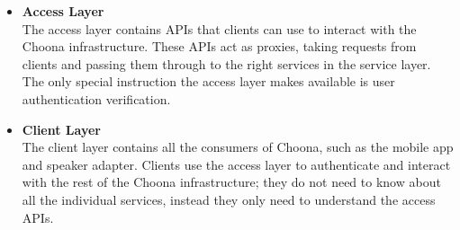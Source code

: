 \begin{itemize}
  \item \textbf{Access Layer}\\
    The access layer contains APIs that clients can use to interact with the Choona infrastructure. These APIs act as proxies, taking requests from clients and passing them through to the right services in the service layer. The only special instruction the access layer makes available is user authentication verification.

  \item \textbf{Client Layer}\\
    The client layer contains all the consumers of Choona, such as the mobile app and speaker adapter. Clients use the access layer to authenticate and interact with the rest of the Choona infrastructure; they do not need to know about all the individual services, instead they only need to understand the access APIs.
\end{itemize}